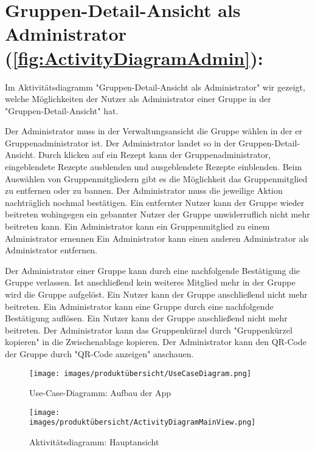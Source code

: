 \documentclass[parskip=full]{scrartcl}
\begin{document}
\section{Gruppen-Detail-Ansicht als Administrator (\autoref{fig:ActivityDiagramAdmin}):}

Im Aktivitätsdiagramm "Gruppen-Detail-Ansicht als Administrator" wir gezeigt, welche Möglichkeiten der Nutzer als Administrator einer Gruppe in der "Gruppen-Detail-Ansicht" hat.

Der Administrator muss in der Verwaltungsansicht die Gruppe wählen in der er Gruppenadministrator ist.
Der Administrator landet so in der Gruppen-Detail-Ansicht.
Durch klicken auf ein Rezept kann der Gruppenadministrator, eingeblendete Rezepte ausblenden und ausgeblendete Rezepte einblenden.\newline
Beim Auswählen von Gruppenmitgliedern gibt es die Möglichkeit das Gruppenmitglied zu entfernen oder zu bannen.
Der Administrator muss die jeweilige Aktion nachträglich nochmal bestätigen.
Ein entfernter Nutzer kann der Gruppe wieder beitreten wohingegen ein gebannter Nutzer der Gruppe unwiderruflich nicht mehr beitreten kann.
Ein Administrator kann ein Gruppenmitglied zu einem Administrator ernennen
Ein Administrator kann einen anderen Administrator als Administrator entfernen.

Der Administrator einer Gruppe kann durch eine nachfolgende Bestätigung die Gruppe verlassen.
Ist anschließend kein weiteres Mitglied mehr in der Gruppe wird die Gruppe aufgelöst. Ein Nutzer kann der Gruppe anschließend nicht mehr beitreten.
Ein Administrator kann eine Gruppe durch eine nachfolgende Bestätigung auflösen. Ein Nutzer kann der Gruppe anschließend nicht mehr beitreten.\newline
Der Administrator kann das Gruppenkürzel durch "Gruppenkürzel kopieren" in die Zwischenablage kopieren. Der Administrator kann den QR-Code der Gruppe durch "QR-Code anzeigen" anschauen.

\newpage

\begin{figure}[!htp]
    \centering
    \begin{adjustbox}{right=160mm}
        \texttt{[image: images/produktübersicht/UseCaseDiagram.png]}
    \end{adjustbox}
    \caption{Use-Case-Diagramm: Aufbau der App}
    \label{fig:UseCaseDiagram}
\end{figure}
\newpage

\begin{figure}[!htp]
    \centering
    \texttt{[image: images/produktübersicht/ActivityDiagramMainView.png]}
    \caption{Aktivitätsdiagramm: Hauptansicht}
    \label{fig:ActivityDiagramMainView}
\end{figure}
\newpage
\end{document}
